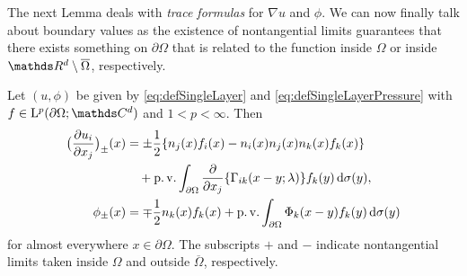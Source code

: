 The next Lemma deals with \emph{trace formulas} for $\nabla u$ and $\phi$. We can now finally talk about boundary values as the existence of nontangential limits guarantees that there exists something on $\partial\Omega$ that is related to the function inside $\Omega$ or inside $\R^d \setminus \overline\Omega$, respectively.

\begin{lem}
  \label{lem:traceFormulas}
  Let $(u,\phi)$ be given by \eqref{eq:defSingleLayer} and \eqref{eq:defSingleLayerPressure} with $f \in \Ell^p(\partial\Omega; \C^d)$ and $1 < p < \infty$.
  Then
  \begin{align}
    \big( \frac{\partial u_i}{\partial x_j} \big)_{\pm}(x) 
    &= \pm \frac{1}{2} \{ n_j(x) f_i(x) - n_i(x) n_j(x) n_k(x) f_k(x) \} \nonumber\\
    &\quad+ \operatorname{p. v.} \int_{\partial\Omega} \frac{\partial}{\partial x_j} \{ \Gamma_{ik} (x - y; \lambda) \} f_k(y) \, {\operatorname{d}\!{\sigma}}(y), \label{eq:traceFormula} \\
    \phi_\pm(x) &= \mp \frac{1}{2} n_k(x) f_k(x) + \operatorname{p. v.}\int_{\partial\Omega} \Phi_k(x - y) f_k(y) \, {\operatorname{d}\!{\sigma}}(y) \nonumber
  \end{align}
  for almost everywhere $x \in \partial\Omega$.
  The subscripts $+$ and $-$ indicate nontangential limits taken inside $\Omega$ and outside $\overline\Omega$, respectively.
\end{lem}

